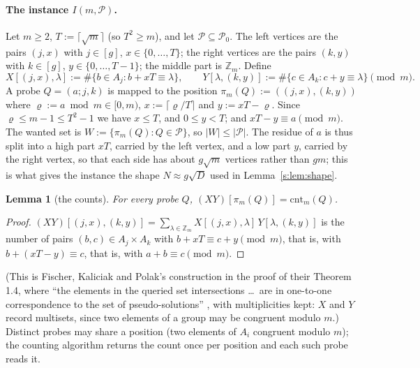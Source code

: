 \documentclass[11pt]{article}
\newtheorem{lemma}[theorem]{Lemma}
\theoremstyle{definition}
\theoremstyle{remark}
\newcommand{\Z}{\mathbb{Z}}
\newcommand{\cnt}{\mathrm{cnt}}
\newcommand{\Pq}{\mathcal{P}}
\begin{document}
\paragraph{The instance $I(m,\Pq)$.} Let $m\ge2$, $T:=\lceil\sqrt m\rceil$ (so $T^2\ge m$), and let $\Pq\subseteq\Pq_0$. The left vertices are the pairs $(j,x)$ with $j\in[g]$, $x\in\{0,\dots,T\}$; the right vertices are the pairs $(k,y)$ with $k\in[g]$, $y\in\{0,\dots,T-1\}$; the middle part is $\Z_m$. Define
\[
X[(j,x),\lambda]:=\#\{b\in A_j: b+xT\equiv\lambda\},\qquad Y[\lambda,(k,y)]:=\#\{c\in A_k: c+y\equiv\lambda\}\pmod m .
\]
A probe $Q=(a;j,k)$ is mapped to the position $\pi_m(Q):=((j,x),(k,y))$ where $\varrho:=a\bmod m\in[0,m)$, $x:=\lceil\varrho/T\rceil$ and $y:=xT-\varrho$. Since $\varrho\le m-1\le T^2-1$ we have $x\le T$, and $0\le y<T$; and $xT-y\equiv a\pmod m$. The wanted set is $W:=\{\pi_m(Q):Q\in\Pq\}$, so $|W|\le|\Pq|$. The residue of $a$ is thus split into a high part $xT$, carried by the left vertex, and a low part $y$, carried by the right vertex, so that each side has about $g\sqrt m$ vertices rather than $gm$; this is what gives the instance the shape $N\approx g\sqrt D$ used in Lemma~\ref{s:lem:shape}.

\begin{lemma}[the counts]\label{s:lem:counts}
For every probe $Q$, $(XY)[\pi_m(Q)]=\cnt_m(Q)$.
\end{lemma}
\begin{proof}
$(XY)[(j,x),(k,y)]=\sum_{\lambda\in\Z_m}X[(j,x),\lambda]\,Y[\lambda,(k,y)]$ is the number of pairs $(b,c)\in A_j\times A_k$ with $b+xT\equiv c+y\pmod m$, that is, with $b+(xT-y)\equiv c$, that is, with $a+b\equiv c\pmod m$.
\end{proof}
(This is Fischer, Kaliciak and Polak's construction in the proof of their Theorem 1.4, where ``the elements in the queried set intersections \dots\ are in one-to-one correspondence to the set of pseudo-solutions'' \cite[p.~18]{FKP24}, with multiplicities kept: $X$ and $Y$ record multisets, since two elements of a group may be congruent modulo $m$.) Distinct probes may share a position (two elements of $A_i$ congruent modulo $m$); the counting algorithm returns the count once per position and each such probe reads it.
\end{document}
